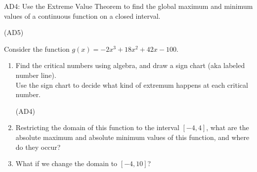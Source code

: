 AD4: Use the Extreme Value Theorem to find the global maximum and minimum values of a continuous function on a closed interval.

\hrulefill (AD5)

Consider the function
\(g(x) =-2x^{3}+18x^{2}+42x-100\).
	
	\begin{enumerate}[leftmargin=15pt]

		\item Find the critical numbers using algebra, and draw a sign chart (aka labeled number line). \\
		Use the sign chart to decide what kind of extremum happens at each critical number.

		\vfill
		\vfill
	
		\hrulefill (AD4)
		\item Restricting the domain of this function to the interval $[-4, 4]$, what are the absolute maximum and absolute minimum values of this function, and where do they occur?

		\vfill
	
		
		\item What if we change the domain to $[-4,10]$?
		
		\vfill
	
	\end{enumerate}
\pagebreak



